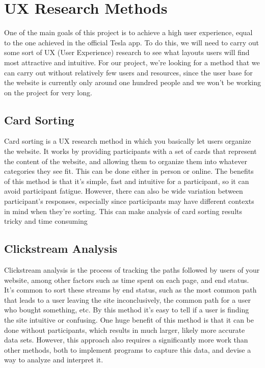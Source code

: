 \documentclass[onecolumn, draftclsnofoot,10pt, compsoc]{IEEEtran}
\begin{document}
        

\section{UX Research Methods}

    One of the main goals of this project is to achieve a high user experience, equal to the one achieved in the official Tesla app. To do this, we will need to carry out some sort of UX (User Experience) research to see what layouts users will find most attractive and intuitive. For our project, we're looking for a method that we can carry out without relatively few users and resources, since the user base for the website is currently only around one hundred people and we won't be working on the project for very long.
    
    \subsection{Card Sorting}
    
        Card sorting is a UX research method in which you basically let users organize the website. 
        It works by providing participants with a set of cards that represent the content of the website, and allowing them to organize them into whatever categories they see fit. 
        This can be done either in person or online\cite{e6}.
        The benefits of this method is that it's simple, fast and intuitive for a participant, so it can avoid participant fatigue. 
        However, there can also be wide variation between participant's responses, especially since participants may have different contexts in mind when they're sorting.
        This can make analysis of card sorting results tricky and time consuming\cite{e7}
    
    \subsection{Clickstream Analysis}
    
        Clickstream analysis is the process of tracking the paths followed by users of your website, among other factors such as time spent on each page, and end status.
        It's common to sort these streams by end status, such as the most common path that leads to a user leaving the site inconclusively, the common path for a user who bought something, etc.
        By this method it's easy to tell if a user is finding the site intuitive or confusing.
        One huge benefit of this method is that it can be done without participants, which results in much larger, likely more accurate data sets\cite{e8}.
        However, this approach also requires a significantly more work than other methods, both to implement programs to capture this data, and devise a way to analyze and interpret it.
    
\end{document}
